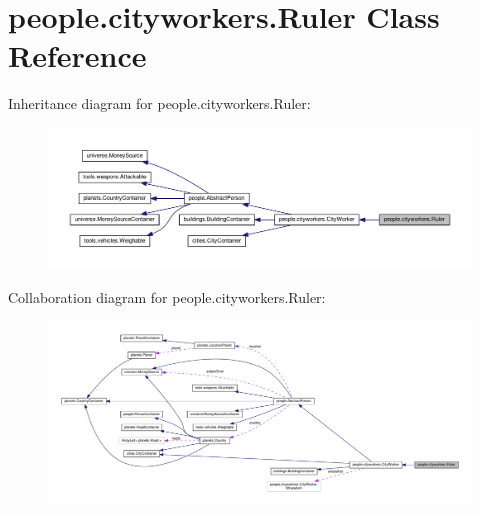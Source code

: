 \hypertarget{classpeople_1_1cityworkers_1_1_ruler}{}\section{people.\+cityworkers.\+Ruler Class Reference}
\label{classpeople_1_1cityworkers_1_1_ruler}


Inheritance diagram for people.\+cityworkers.\+Ruler\+:
\nopagebreak
\begin{figure}[H]
\begin{center}
\leavevmode
\includegraphics[width=350pt]{classpeople_1_1cityworkers_1_1_ruler__inherit__graph}
\end{center}
\end{figure}


Collaboration diagram for people.\+cityworkers.\+Ruler\+:
\nopagebreak
\begin{figure}[H]
\begin{center}
\leavevmode
\includegraphics[width=350pt]{classpeople_1_1cityworkers_1_1_ruler__coll__graph}
\end{center}
\end{figure}
